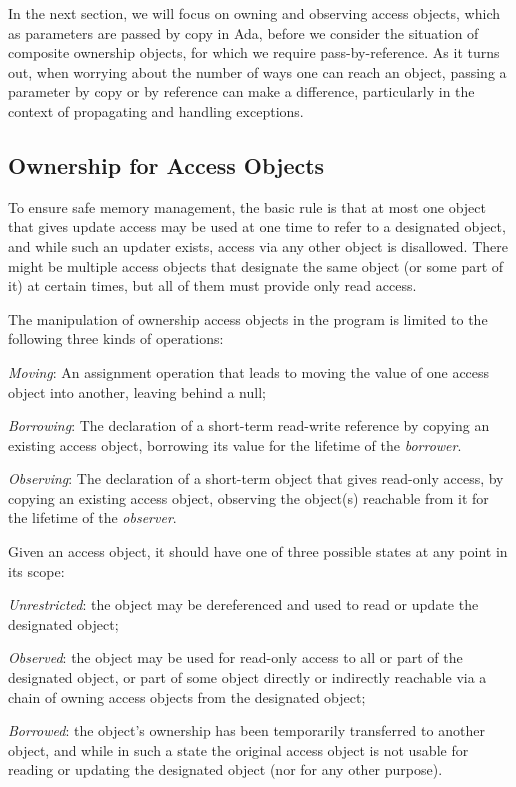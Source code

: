 \documentclass{llncs}
\begin{document}
In the next section, we will focus on owning and observing access objects, which as parameters are passed by copy in Ada, before we
consider the situation of composite ownership objects, for which we require pass-by-reference.  As it turns out, when worrying about the number of ways one can reach an object, passing a parameter by copy or by reference can make a difference, particularly in the context of propagating and handling exceptions.


\subsection{Ownership for Access Objects}
\label{subsec:ownershipAccess}

To ensure safe memory management, the basic rule is that at most one object that gives update access may be used at one time to refer to a designated object, and while such an updater exists, access via any other object is disallowed.  There might be multiple access objects that designate the same object (or some part of it) at certain times, but all of them must provide only read access.


The manipulation of ownership access objects in the program is limited to the following three kinds of operations:

\begin{compactitem}
  \item \textit{Moving}: An assignment operation that leads to moving the value of one access object into another, leaving behind a null;
  \item \textit{Borrowing}: The declaration of a short-term read-write reference by copying an existing access object, borrowing its value for the lifetime of the \textit{borrower}.
  \item \textit{Observing}: The declaration of a short-term object that gives read-only access, by copying an existing access object, observing the object(s) reachable from it for the lifetime of the \textit{observer}.
\end{compactitem}

Given an access object, it should have one of three possible states at any point in its scope:

\begin{compactitem}
  \item \textit {Unrestricted}: the object may be dereferenced and used to read or update the designated object;
  \item \textit {Observed}: the object may be used for read-only access to all or part of the designated object, or part of some object directly or indirectly reachable via a chain of owning access objects from the designated object;
  \item \textit {Borrowed}: the object's ownership has been temporarily transferred to another object,  and while in such a state the original access object is not usable for reading or updating the designated object (nor for any other purpose).
\end{compactitem}
\end{document}
